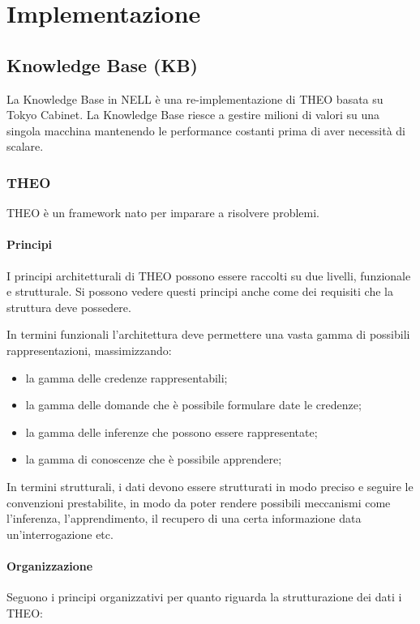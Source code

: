 \section{Implementazione}
\label{impl}
\subsection{Knowledge Base (KB)}
La Knowledge Base in NELL è una re-implementazione di THEO basata su Tokyo Cabinet. La Knowledge Base riesce a gestire milioni di valori su una singola macchina mantenendo le performance costanti prima di aver necessità di scalare\cite{TowardAnArchitecture:online}.
\subsubsection{THEO}
THEO è un framework nato per imparare a risolvere problemi. 
\paragraph{Principi}
I principi architetturali di THEO possono essere raccolti su due livelli, funzionale e strutturale. Si possono vedere questi principi anche come dei requisiti che la struttura deve possedere.

\noindent In termini funzionali l'architettura deve permettere una vasta gamma di possibili rappresentazioni, massimizzando:
\begin{itemize}
	\item la gamma delle credenze rappresentabili;
	\item la gamma delle domande che è possibile formulare date le credenze;
	\item la gamma delle inferenze che possono essere rappresentate;
	\item la gamma di conoscenze che è possibile apprendere;
\end{itemize}

In termini strutturali, i dati devono essere strutturati in modo preciso e seguire le convenzioni prestabilite, in modo da poter rendere possibili meccanismi come l'inferenza, l'apprendimento, il recupero di una certa informazione data un'interrogazione etc.

\paragraph{Organizzazione}
Seguono i principi organizzativi per quanto riguarda la strutturazione dei dati i THEO:

